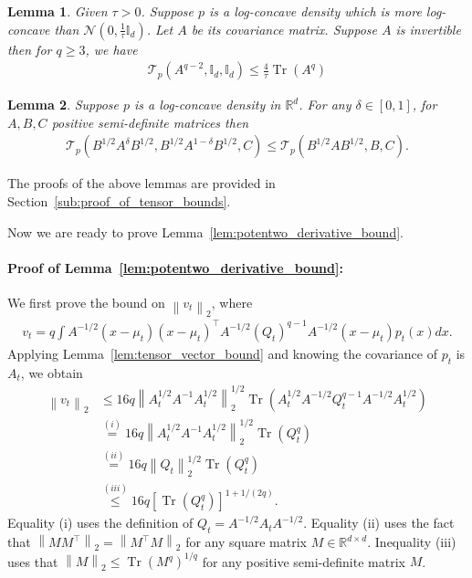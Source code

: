 \documentclass[11pt,twoside]{article}
\newcommand{\ttensor}{\mathcal{T}}
\newcommand{\co}{A}
\newcommand{\qo}{Q}
\theoremstyle{named}
\theoremstyle{plain}
\newtheorem{lemma}{Lemma}
\newcommand{\vecnorm}[2]{\left\| #1\right\|_{#2}}
\newcommand{\usedim}{\ensuremath{d}}
\newcommand{\dims}{\usedim}
\DeclareMathOperator{\trace}{Tr}
\newcommand{\Normal}{\ensuremath{\mathcal{N}}}
\newcommand{\Ind}{\ensuremath{\mathbb{I}}}
\newcommand{\real}{\ensuremath{\mathbb{R}}}
\newcommand{\brackets}[1]{\left[ #1 \right]}
\newcommand{\parenth}[1]{\left( #1 \right)}
\newcommand{\tp}{^\top}
\begin{document}
\begin{lemma}
  \label{lem:ttensor_oneoverT_bound}
  Given $\tau > 0$. Suppose $p$ is a log-concave density which is more log-concave than $\Normal(0, \frac{1}{\tau} \Ind_\dims)$. Let $A$ be its covariance matrix. Suppose $A$ is invertible then for $q \geq 3$, we have
  \begin{align*}
    \ttensor_p(A^{q-2}, \Ind_\dims, \Ind_\dims) \leq \frac{4}{\tau} \trace\parenth{A^{q}}
  \end{align*}
\end{lemma}

\begin{lemma}
  \label{lem:ttensor_swap}
  Suppose $p$ is a log-concave density in $\real^\dims$. For any $\delta \in [0, 1]$, for $A, B, C$ positive semi-definite matrices then
  \begin{align}
    \label{eq:ttensor_swap}
    \ttensor_{p}(B^{1/2}A^\delta B^{1/2}, B^{1/2}A^{1-\delta}B^{1/2}, C) \leq \ttensor_{p}(B^{1/2}AB^{1/2}, B, C).
  \end{align}
\end{lemma}
The proofs of the above lemmas are provided in Section~\ref{sub:proof_of_tensor_bounds}.

Now we are ready to prove Lemma~\ref{lem:potentwo_derivative_bound}.
\paragraph{Proof of Lemma~\ref{lem:potentwo_derivative_bound}:} We first prove the bound on $\vecnorm{v_t}{2}$, where
\begin{align*}
  v_t = q \int \co^{-1/2} \parenth{x-\mu_t} \parenth{x-\mu_t}\tp \co^{-1/2} \parenth{\qo_t}^{q-1} \co^{-1/2} \parenth{x-\mu_t} p_t(x) dx.
\end{align*}
Applying Lemma~\ref{lem:tensor_vector_bound} and knowing the covariance of $p_t$ is $A_t$, we obtain
\begin{align*}
  \vecnorm{v_t}{2} &\leq 16 q \vecnorm{A_t^{1/2} \co^{-1} A_t^{1/2}}{2}^{1/2} \trace\parenth{A_t^{1/2} \co^{-1/2} Q_t^{q-1} \co^{-1/2} A_t^{1/2}} \\
  &\stackrel{(i)}{=} 16 q \vecnorm{A_t^{1/2} \co^{-1} A_t^{1/2}}{2}^{1/2} \trace\parenth{Q_t^{q}} \\
  &\stackrel{(ii)}{=} 16 q \vecnorm{Q_t}{2}^{1/2} \trace\parenth{Q_t^{q}} \\
  &\stackrel{(iii)}{\leq}  16 q \brackets{\trace\parenth{Q_t^{q}}}^{1+1/(2q)}.
\end{align*}
Equality (i) uses the definition of $Q_t = \co^{-1/2} A_t \co^{-1/2}$. Equality (ii) uses the fact that $\vecnorm{MM\tp}{2} = \vecnorm{M\tp M}{2}$ for any square matrix $M \in \real^{\dims \times \dims}$.
Inequality (iii) uses that $\vecnorm{M}{2} \leq \trace\parenth{M^q}^{1/q}$ for any positive semi-definite matrix $M$.
\end{document}
